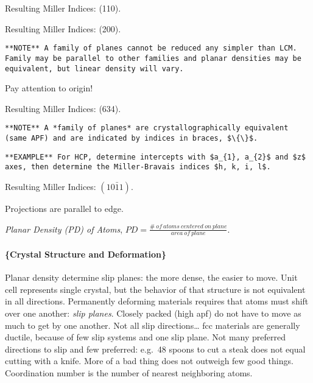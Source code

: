 \documentclass[
]{article}
\begin{document}
{Resulting Miller Indices: (110).}

{Resulting Miller Indices: (200).}

\begin{verbatim}
**NOTE** A family of planes cannot be reduced any simpler than LCM. Family may be parallel to other families and planar densities may be equivalent, but linear density will vary.
\end{verbatim}

{Pay attention to origin!}

{Resulting Miller Indices: (634).}

\begin{verbatim}
**NOTE** A *family of planes* are crystallographically equivalent (same APF) and are indicated by indices in braces, $\{\}$.
\end{verbatim}

\begin{verbatim}
**EXAMPLE** For HCP, determine intercepts with $a_{1}, a_{2}$ and $z$ axes, then determine the Miller-Bravais indices $h, k, i, l$.
\end{verbatim}

{Resulting Miller Indices: \((10\bar{1}1)\).}

{Projections are parallel to edge.}

{\textit{Planar Density (PD) of Atoms},
\(PD = \frac{\#~of~atoms~centered~on~plane}{area~of~plane}\).}

\hypertarget{crystal-structure-and-deformation}{%
\paragraph{\{Crystal Structure and
Deformation\}}\label{crystal-structure-and-deformation}}

Planar density determine slip planes: the more dense, the easier to
move. Unit cell represents single crystal, but the behavior of that
structure is not equivalent in all directions. Permanently deforming
materials requires that atoms must shift over one another:
\textit{slip planes}. Closely packed (high apf) do not have to move as
much to get by one another. Not all slip directions\ldots{} fcc
materials are generally ductile, because of few slip systems and one
slip plane. Not many preferred directions to slip and few preferred:
e.g.~48 spoons to cut a steak does not equal cutting with a knife. More
of a bad thing does not outweigh few good things. Coordination number is
the number of nearest neighboring atoms.
\end{document}

